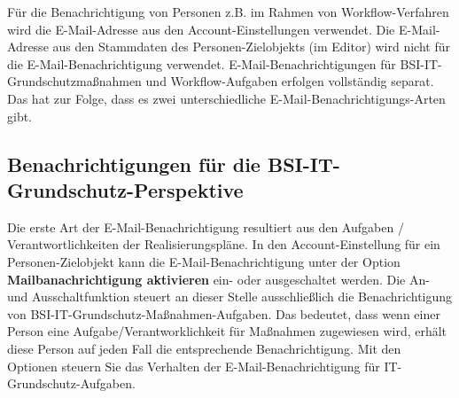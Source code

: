 \documentclass[a4paper,10pt]{book}
\begin{document}
Für die Benachrichtigung von Personen z.B. im Rahmen von Workflow-Verfahren wird die E-Mail-Adresse aus den Account-Einstellungen verwendet.
Die E-Mail-Adresse aus den Stammdaten des Personen-Zielobjekts (im Editor) wird nicht für die E-Mail-Benachrichtigung verwendet.
\newline
E-Mail-Benachrichtigungen für BSI-IT-Grundschutzmaßnahmen und Workflow-Aufgaben erfolgen vollständig separat. Das hat zur Folge, dass es zwei unterschiedliche
E-Mail-Benachrichtigungs-Arten gibt.
\newline
\subsection{Benachrichtigungen für die BSI-IT-Grundschutz-Per\-spek\-ti\-ve}
Die erste Art der E-Mail-Benachrichtigung resultiert aus den Aufgaben / Ver\-ant\-wort\-lich\-kei\-ten der Realisierungspläne.
In den Account-Einstellung für ein Personen-Zielobjekt kann die E-Mail-Benach\-richtigung unter der Option \textbf{Mailbanachrichtigung aktivieren} ein- oder ausgeschaltet werden.
Die An- und Ausschaltfunktion steuert an dieser Stelle ausschließlich die Benachrichtigung von BSI-IT-Grundschutz-Maßnahmen-Aufgaben. Das bedeutet, dass wenn einer Person eine
Aufgabe/Verantworklichkeit für Maßnahmen zugewiesen wird, erhält diese Person auf jeden Fall die entsprechende Benachrichtigung. Mit den Optionen steuern Sie das
Verhalten der E-Mail-Benachrichtigung für IT-Grundschutz-Aufgaben.
\end{document}
